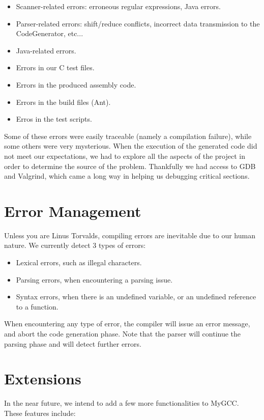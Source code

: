 \documentclass{article}
\begin{document}
\begin{itemize}
\item Scanner-related errors: erroneous regular expressions, Java errors.
\item Parser-related errors: shift/reduce conflicts, incorrect data transmission to the CodeGenerator, etc...
\item Java-related errors.
\item Errors in our C test files.
\item Errors in the produced assembly code.
\item Errors in the build files (Ant).
\item Erros in the test scripts.
\end{itemize}

Some of these errors were easily traceable (namely a compilation failure), while some others were very mysterious. When the execution of the generated code did not meet our expectations, we had to explore all the aspects of the project in order to determine the source of the problem. Thankfully we had access to GDB and Valgrind, which came a long way in helping us debugging critical sections.\\


\section{Error Management}
Unless you are Linus Torvalds, compiling errors are inevitable due to our human nature. We currently detect 3 types of errors:

\begin{itemize}
\item Lexical errors, such as illegal characters.
\item Parsing errors, when encountering a parsing issue.
\item Syntax errors, when there is an undefined variable, or an undefined reference to a function.
\end{itemize}

When encountering any type of error, the compiler will issue an error message, and abort the code generation phase. Note that the parser will continue the parsing phase and will detect further errors.

\section{Extensions}
In the near future, we intend to add a few more functionalities to MyGCC.\\
These features include:
\end{document}
